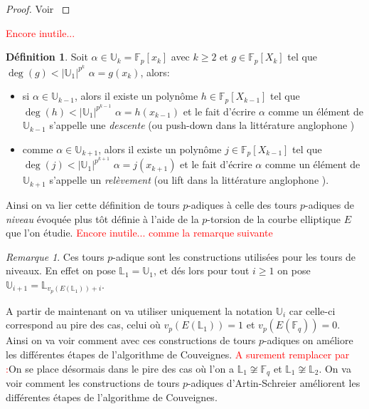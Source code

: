 \documentclass[10pt,a4paper]{book}
\theoremstyle{plain}
\theoremstyle{definition}
\theoremstyle{definition}
\theoremstyle{definition}
\theoremstyle{definition}
\newtheorem{defi}[thm]{Définition}
\theoremstyle{remark}
\newtheorem{rem}[thm]{Remarque}
\theoremstyle{remark}
\theoremstyle{definition}
\begin{document}
\begin{proof}
Voir  \cite[Théorème 2]{DeFeo-Shost'12} 
\end{proof}
\textcolor{red}{Encore inutile...}
\begin{defi}
Soit $\alpha \in \mathbb{U}_k=\mathbb{F}_p[x_k]$ avec $k \geqslant 2$ et $g \in \mathbb{F}_p[X_k]$ tel que $\deg(g)<|\mathbb{U}_1|^{p^k}$ $\alpha=g(x_k)$, alors:
\begin{itemize} 
\item si $\alpha \in \mathbb{U}_{k-1}$, alors il existe un polynôme $h \in \mathbb{F}_p[X_{k-1}]$ tel que $\deg(h)<|\mathbb{U}_1|^{p^{k-1}}$ $\alpha=h(x_{k-1})$ et le fait d'écrire $\alpha$ comme un élément de $\mathbb{U}_{k-1}$ s'appelle une \emph{descente} (ou push-down dans la littérature anglophone \cite{DeFeo-Shost'12})
\item comme $\alpha \in \mathbb{U}_{k+1}$, alors il existe un polynôme $j \in \mathbb{F}_p[X_{k-1}]$ tel que $\deg(j)<|\mathbb{U}_1|^{p^{k+1}}$ $\alpha=j(x_{k+1})$ et le fait d'écrire $\alpha$ comme un élément de $\mathbb{U}_{k+1}$ s'appelle un \emph{relèvement} (ou lift dans la littérature anglophone \cite{DeFeo-Shost'12}).
\end{itemize}
\end{defi}

Ainsi on va lier cette définition de tours $p$-adiques à celle des tours $p$-adiques de \emph{niveau} évoquée plus tôt définie à l'aide de la $p$-torsion de la courbe elliptique $E$ que l'on étudie.
\textcolor{red}{Encore inutile... comme la remarque suivante}
\begin{rem}
Ces tours $p$-adique sont les constructions utilisées pour les tours de niveaux.
En effet on pose $\mathbb{L}_1=\mathbb{U}_1$, et dés lors pour tout $i\geqslant 1$ on pose $\mathbb{U}_{i+1}=\mathbb{L}_{v_p(E(\mathbb{L}_1))+i}$.
\end{rem}


A partir de maintenant on va utiliser uniquement la notation $\mathbb{U}_i$ car celle-ci correspond au pire des cas, celui où $v_p(E(\mathbb{L}_1))=1$ et $v_p(E(\mathbb{F}_q))=0$. Ainsi on va voir comment avec ces constructions de tours $p$-adiques on améliore les différentes étapes de l'algorithme de Couveignes.
\textcolor{red}{A surement remplacer par :}On se place désormais dans le pire des cas où l'on a $\mathbb{L}_1 \not \cong \mathbb{F}_q$ et $\mathbb{L}_1 \not \cong \mathbb{L}_2$. On va voir comment les constructions de tours $p$-adiques d'Artin-Schreier améliorent les différentes étapes de l'algorithme de Couveignes.
\end{document}
